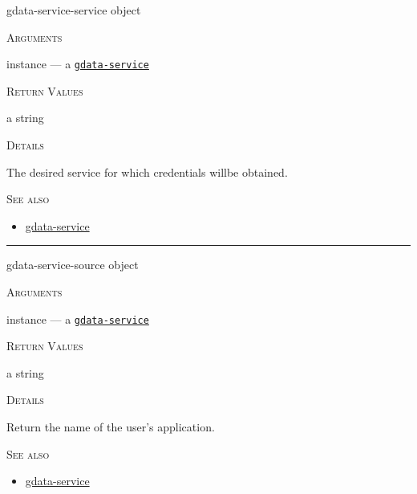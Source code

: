 \documentclass[a4paper]{report}
\begin{document}
    \label{cl-gdata-service__fun__gdata-service-service}
    \begin{defun}[Function]
    gdata-service-service object


    
    \bigskip
    \textsc{Arguments}

instance
	--- a \hyperref[cl-gdata-service__class__gdata-service]{\texttt{gdata-service}}
  




    
    \bigskip
    \textsc{Return Values}

a string


	
    \bigskip
    \textsc{Details}

       
       The desired service for which credentials willbe obtained.


      
    \bigskip
    \textsc{See also}


	
    \begin{itemize}
    
	  
    \item
    \hyperref[cl-gdata-service__class__gdata-service]{gdata-service}
    
	
    \end{itemize}
  
      


    
    \end{defun}
  
  

    \rule{\linewidth}{0.1mm}
    
    \label{cl-gdata-service__fun__gdata-service-source}
    \begin{defun}[Function]
    gdata-service-source object


    
    \bigskip
    \textsc{Arguments}

instance
	--- a \hyperref[cl-gdata-service__class__gdata-service]{\texttt{gdata-service}}
  




    
    \bigskip
    \textsc{Return Values}

a string


	
    \bigskip
    \textsc{Details}

              Return the name of the user's application.


      
    \bigskip
    \textsc{See also}


	
    \begin{itemize}
    
	  
    \item
    \hyperref[cl-gdata-service__class__gdata-service]{gdata-service}
    
	
    \end{itemize}
  
      


    
    \end{defun}
  
\end{document}

